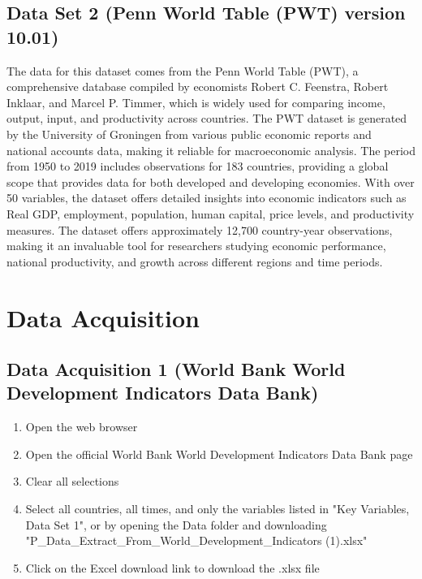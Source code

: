 \documentclass[12pt]{article}
\begin{document}
\subsection{Data Set 2 (Penn World Table (PWT) version 10.01)}

 The data for this dataset comes from the Penn World Table (PWT), a comprehensive database compiled by economists Robert C. Feenstra, Robert Inklaar, and Marcel P. Timmer, which is widely used for comparing income, output, input, and productivity across countries. The PWT dataset is generated by the University of Groningen from various public economic reports and national accounts data, making it reliable for macroeconomic analysis. The period from 1950 to 2019 includes observations for 183 countries, providing a global scope that provides data for both developed and developing economies. With over 50 variables, the dataset offers detailed insights into economic indicators such as Real GDP, employment, population, human capital, price levels, and productivity measures. The dataset offers approximately 12,700 country-year observations, making it an invaluable tool for researchers studying economic performance, national productivity, and growth across different regions and time periods.



\section{Data Acquisition}
\label{sec:theory}


    \subsection{Data Acquisition 1 (World Bank World Development Indicators Data Bank)}

\begin{enumerate}
    \item Open the web browser 
       \item  Open the official World Bank World Development Indicators Data Bank page
       \item Clear all selections
       \item Select all countries, all times, and only the variables listed in "Key Variables, Data Set 1", or by opening the Data folder and downloading  "P\_Data\_Extract\_From\_World\_Development\_Indicators (1).xlsx"

       \item Click on the Excel download link to download the .xlsx file
    
\end{enumerate}
\end{document}
